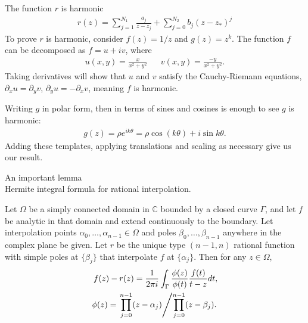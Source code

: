 \documentclass{seminar}
\begin{document}
\begin{slide} %
\large The function $r$ is harmonic 
\small
\begin{align*}
r(z)= \sum_{j=1}^{N_1} \frac{a_j}{z-z_j} + \sum_{j=0}^{N_2} b_j (z-z_*)^j
\end{align*}
To prove $r$ is harmonic, consider $f(z)=1/z$ and $g(z)=z^k$.
The function $f$ can be decomposed as $f=u+iv$, where
\begin{align*}
u(x,y)=\frac{x}{x^2+y^2} &&
v(x,y)=\frac{-y}{x^2+y^2}.
\end{align*}
Taking derivatives will show that $u$ and $v$ satisfy the Cauchy-Riemann equations, ${\partial}_x u={\partial}_y v$, ${\partial}_y u=-{\partial}_x v$, meaning $f$ is harmonic.

Writing $g$ in polar form, then in terms of sines and cosines is enough to see $g$ is harmonic:
\begin{align*}
g(z)=\rho e^{i k \theta} = \rho \cos{(k\theta)} + i \sin{k\theta} .
\end{align*}
Adding these templates, applying translations and scaling as necessary give us our result.
\end{slide} %




\begin{slide} %
\large An important lemma \\

\small
Hermite integral formula for rational interpolation.

Let $\Omega$ be a simply connected domain in $\mathds{C}$ bounded by a closed curve $\Gamma$, and let $f$ be analytic in that domain and extend continuously to the boundary. Let interpolation points ${\alpha}_0, \ldots ,{\alpha}_{n-1} \in \Omega$ and poles ${\beta}_0, \ldots ,{\beta}_{n-1}$ anywhere in the complex plane be given. Let $r$ be the unique type $(n-1,n)$ rational function with simple poles at $\{{\beta}_j\}$ that interpolate $f$ at $\{{\alpha}_j\}$. Then for any $z \in \Omega$,
\begin{align*}
f(z)-r(z)=\frac{1}{2 \pi i} \int_{\Gamma} \frac{\phi (z)}{\phi (t)} \frac{f(t)}{t-z}dt, \\
\phi (z) = \left. \prod_{j=0}^{n-1}(z-{\alpha}_j) \middle/ \prod_{j=0}^{n-1}(z-{\beta}_j). \right.
\end{align*}
\end{slide} %
\end{document}
